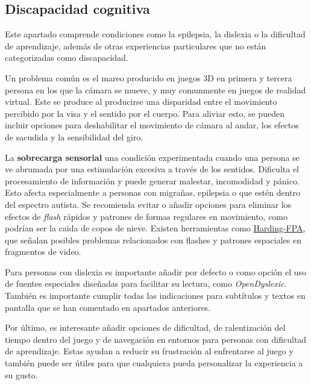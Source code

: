 \subsection{Discapacidad cognitiva}

Este apartado comprende condiciones como la epilepsia, la dislexia o la dificultad de aprendizaje, además de otras experiencias particulares que no están categorizadas como discapacidad.

Un problema común es el mareo producido en juegos 3D en primera y tercera persona en los que la cámara se mueve, y muy comunmente en juegos de realidad virtual. Este se produce al producirse una disparidad entre el movimiento percibido por la visa y el sentido por el cuerpo. Para aliviar esto, se pueden incluir opciones para deshabilitar el movimiento de cámara al andar, los efectos de sacudida y la sensibilidad del giro.

La \textbf{sobrecarga sensorial} una condición experimentada cuando una persona se ve abrumada por una estimulación excesiva a través de los sentidos. Dificulta el procesamiento de información y puede generar malestar, incomodidad y pánico. Esto afecta especialmente a personas con migrañas, epilepsia o que estén dentro del espectro autista. Se recomienda evitar o añadir opciones para eliminar los efectos de \textit{flash} rápidos y patrones de formas regulares en movimiento, como podrían ser la caida de copos de nieve. Existen herramientas como \href{https://www.hardingfpa.com/}{Harding-FPA}, que señalan posibles problemas relacionados con flashes y patrones espaciales en fragmentos de video.

Para personas con dislexia es importante añadir por defecto o como opción el uso de fuentes especiales diseñadas para facilitar su lectura, como \textit{OpenDyslexic}. También es importante cumplir todas las indicaciones para subtítulos y textos en pantalla que se han comentado en apartados anteriores.

Por último, es interesante añadir opciones de dificultad, de ralentización del tiempo dentro del juego y de navegación en entornos para personas con dificultad de aprendizaje. Estas ayudan a reducir su frustración al enfrentarse al juego y también puede ser útiles para que cualquiera pueda personalizar la experiencia a su gusto.

